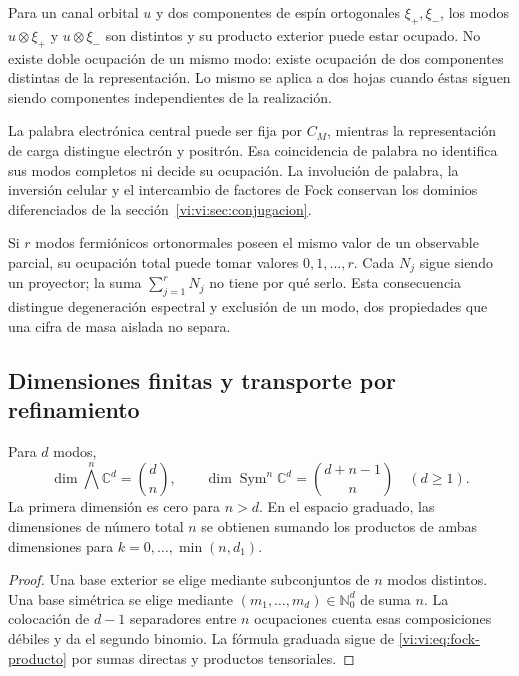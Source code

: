 Para un canal orbital \(u\) y dos componentes de espín
ortogonales \(\xi_+,\xi_-\), los modos
\(u\otimes\xi_+\) y \(u\otimes\xi_-\) son distintos y su
producto exterior puede estar ocupado. No existe doble ocupación
de un mismo modo: existe ocupación de dos componentes distintas
de la representación. Lo mismo se aplica a dos hojas cuando éstas
siguen siendo componentes independientes de la realización.

La palabra electrónica central puede ser fija por \(C_M\), mientras
la representación de carga distingue electrón y positrón. Esa
coincidencia de palabra no identifica sus modos completos ni
decide su ocupación. La involución de palabra, la inversión
celular y el intercambio de factores de Fock conservan los
dominios diferenciados de la sección~\ref{vi:vi:sec:conjugacion}.

Si \(r\) modos fermiónicos ortonormales poseen el mismo valor
de un observable parcial, su ocupación total puede tomar valores
\(0,1,\ldots,r\). Cada \(N_j\) sigue siendo un proyector;
la suma \(\sum_{j=1}^rN_j\) no tiene por qué serlo. Esta
consecuencia distingue degeneración espectral y exclusión de
un modo, dos propiedades que una cifra de masa aislada no separa.

\subsection{Dimensiones finitas y transporte por refinamiento}
\label{vi:vi:subsec:fock-refinamiento}

\begin{proposition}
\label{vi:vi:prop:censo-fock}
Para \(d\) modos,
\[
 \dim\bigwedge^n\mathbb C^d=\binom dn,
 \qquad
 \dim\operatorname{Sym}^n\mathbb C^d=\binom{d+n-1}{n}
 \quad(d\ge1).
\]
La primera dimensión es cero para \(n>d\). En el espacio
graduado, las dimensiones de número total \(n\) se obtienen
sumando los productos de ambas dimensiones para
\(k=0,\ldots,\min(n,d_1)\).
\end{proposition}
\begin{proof}
Una base exterior se elige mediante subconjuntos de \(n\) modos
distintos. Una base simétrica se elige mediante
\((m_1,\ldots,m_d)\in\mathbb N_0^d\) de suma \(n\).
La colocación de \(d-1\) separadores entre \(n\) ocupaciones
cuenta esas composiciones débiles y da el segundo binomio.
La fórmula graduada sigue de \eqref{vi:vi:eq:fock-producto} por
sumas directas y productos tensoriales.
\end{proof}

